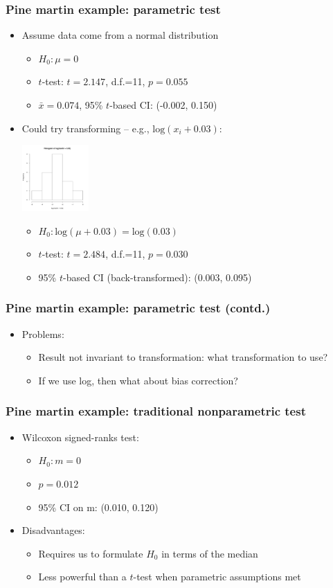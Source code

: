 \documentclass[ignorenonframetext]{beamer} %
\newcommand{\bc}{\begin{center}}
\newcommand{\ec}{\end{center}}
\newcommand{\bi}{\begin{itemize}}
\newcommand{\ei}{\end{itemize}}
\begin{document}
\begin{frame}
	\frametitle{Pine martin example: parametric test}
	\bi
		\item Assume data come from a normal distribution
			\bi
				\item $H_0: \mu=0$
				\item $t$-test: $t=2.147$, d.f.=11, $p=0.055$
				\item $\bar{x}=0.074$, 95\% $t$-based CI: (-0.002, 0.150) 
			\ei
		\item Could try transforming -- e.g., $\mbox{log}(x_i + 0.03)$:\\
\bc
\includegraphics[height=1in]{martin_hist_log}
\ec
		\bi
			\item $H_0: \mbox{log}(\mu+0.03)=\mbox{log}(0.03)$
			\item $t$-test: $t=2.484$, d.f.=11, $p=0.030$
			\item 95\% $t$-based CI (back-transformed): (0.003, 0.095) 
		\ei
	\ei
\end{frame}
\begin{frame}
	\frametitle{Pine martin example: parametric test (contd.)}
	\bi
    \item Problems:
    \bi
			\item Result not invariant to transformation: what transformation to use?
			\item If we use log, then what about bias correction?
    \ei					
	\ei
\end{frame}

\begin{frame}
	\frametitle{Pine martin example: traditional nonparametric test}
	\bi
		\item Wilcoxon signed-ranks test:
		\bi
			\item $H_0: m=0$
			\item $p = 0.012$
			\item 95\% CI on m: (0.010, 0.120)
		\ei
		\item Disadvantages:
		\bi
			\item Requires us to formulate $H_0$ in terms of the median
			\item Less powerful than a $t$-test when parametric assumptions met
		\ei	
	\ei
\end{frame}
\end{document}
